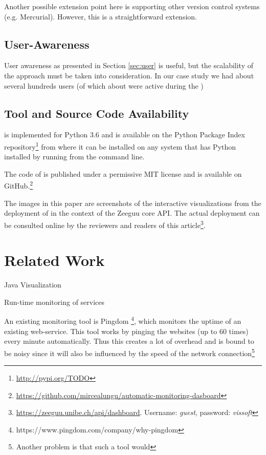 \documentclass[conference]{IEEEtran}
\begin{document}
  Another possible extension point here is supporting other version control systems (e.g. Mercurial). However, this is a straightforward extension.



  \subsection{User-Awareness }

    User awareness as presented in Section \ref{sec:user} is useful, but the scalability of the approach must be taken into consideration. In our case study we had about several hundreds users (of which about \activeUserCount were active during the ) 



  \subsection{Tool and Source Code Availability}
  \label{sec:install}

    \tool is implemented for Python 3.6 and is available on the Python Package Index repository\footnote{\url{http://pypi.org/TODO}} from where it can be installed on any system that has Python installed by running \install from the command line. 

    The code of \tool is published under a permissive MIT license and is available on GitHub.\footnote{\url{https://github.com/mircealungu/automatic-monitoring-dasboard}}

    The images in this paper are screenshots of the interactive visualizations from the deployment of \tool in the context of the Zeeguu core API. The actual deployment can be consulted online by the reviewers and readers of this article\footnote{\url{https://zeeguu.unibe.ch/api/dashboard}. Username: {\em guest}, password: {\em vissoft}}.


\section{Related Work}
\label{sec:related}


Java Visualization \cite{Pauw02a}

Run-time monitoring of services \cite{ghezzi2007run}

An existing monitoring tool is Pingdom \footnote{https://www.pingdom.com/company/why-pingdom}, which monitors the uptime of an existing web-service. This tool works by pinging the websites (up to 60 times) every minute automatically. Thus this creates a lot of overhead and is bound to be noisy since it will also be influenced by the speed of the network connection\footnote{Another problem is that such a tool would }
\end{document}
